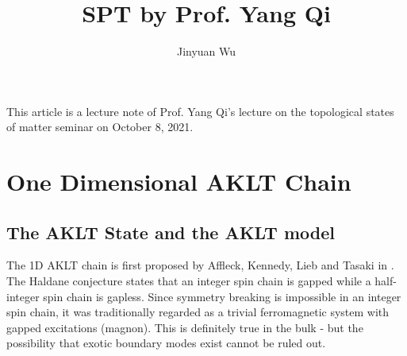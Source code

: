 \documentclass[hyperref, a4paper]{article}
\title{SPT by Prof. Yang Qi}
\author{Jinyuan Wu}
\begin{document}
\maketitle

This article is a lecture note of Prof. Yang Qi's lecture on the topological states of matter seminar on October 8, 2021.

\section{One Dimensional AKLT Chain}

\subsection{The AKLT State and the AKLT model}

The 1D AKLT chain is first proposed by Affleck, Kennedy, Lieb and Tasaki in \cite{Affleck_1987}.
The Haldane conjecture states that an integer spin chain is gapped while a half-integer spin chain is gapless.
Since symmetry breaking is impossible in an integer spin chain, it was traditionally regarded as a trivial ferromagnetic system with gapped excitations (magnon).
This is definitely true in the bulk - but the possibility that exotic boundary modes exist cannot be ruled out.
\end{document}
